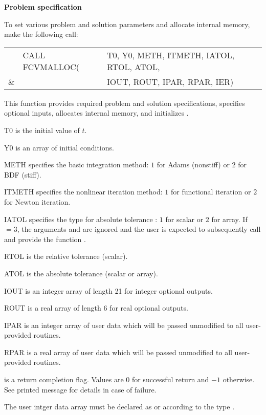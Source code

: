 \begin{Steps}
\item {\bf Problem specification}

  To set various problem and solution parameters and allocate
  internal memory, make the following call:
  {
    \begin{tabular}[t]{@{}r@{}l@{}l}
        &CALL FCVMALLOC(&T0, Y0, METH, ITMETH, IATOL, RTOL, ATOL, \\
    {\&}&               &IOUT, ROUT, IPAR, RPAR, IER)
    \end{tabular}
  }
  {
    This function provides required problem and solution specifications, 
    specifies optional inputs,
    allocates internal memory, and initializes {\cvode}.
  }
  {
    \begin{args}[ITMETH]
    \item[T0] is the initial value of $t$.
    \item[Y0] is an array of initial conditions.
    \item[METH] specifies the  basic integration method: 
      $1$ for Adams (nonstiff) or $2$ for BDF (stiff).
    \item[ITMETH] specifies the nonlinear iteration method: 
      $1$ for functional iteration or $2$ for Newton iteration.
    \item[IATOL] specifies the type for absolute tolerance :
      $1$ for scalar or $2$ for array. If $=3$, the arguments
       and  are ignored and the user is expected to
      subsequently call  and provide the function .
    \item[RTOL] is the relative tolerance (scalar).
    \item[ATOL] is the absolute tolerance (scalar or array).
    \item[IOUT] is an integer array of length 21 for integer optional outputs.
    \item[ROUT] is a real array of length 6 for real optional outputs.
    \item[IPAR] is an integer array of user data which will be passed
      unmodified to all user-provided routines.
    \item[RPAR] is a real array of user data which will be passed
      unmodified to all user-provided routines.
    \end{args}
  }
  {
     is a return completion flag.  Values are $0$ for successful return
    and $-1$ otherwise. See printed message for details in case of failure.
  }
  {
    The user intger data array  must be declared as  or 
     according to the {\C} type .

}
\end{Steps}
